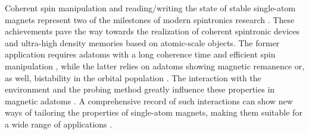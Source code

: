 \documentclass[
reprint,amsmath,amssymb,aps]{revtex4-2}
\begin{document}

Coherent spin manipulation and reading/writing the state of stable single-atom magnets represent two of the milestones of modern spintronics research \cite{yangCoherentSpinManipulation2019,Natterer2017}. These achievements pave the way towards the realization of coherent spintronic devices and ultra-high density memories based on atomic-scale objects. The former application requires adatoms with a long coherence time and efficient spin manipulation \cite{baumannElectronParamagneticResonance2015,yangCoherentSpinManipulation2019}, while the latter relies on adatoms showing magnetic remanence \cite{baltic2018,donatiMagneticRemanenceSingle2016,Natterer2018} or, as well, bistability in the orbital population \cite{kiralyOrbitallyDerivedSingleatom2018}. The interaction with the environment and the probing method greatly influence these properties in magnetic adatoms \cite{malavolti_MinimallyInvasiveSpin_2020,verlhacAtomicscaleSpinSensing2019a}. A comprehensive record of such interactions can show new ways of tailoring the properties of single-atom magnets, making them suitable for a wide range of applications \cite{kiraly_AtomicBoltzmannMachine_2021,khajetooriansRealizingAllSpinBased2011}.
\end{document}
